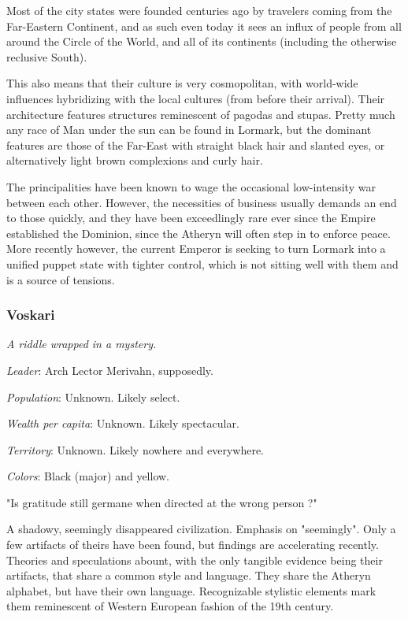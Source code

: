 Most of the city states were founded centuries ago by travelers coming from the Far-Eastern Continent, and as such even today it sees an influx of people from all around the Circle of the World, and all of its continents (including the otherwise reclusive South). 

This also means that their culture is very cosmopolitan, with world-wide influences hybridizing with the local cultures (from before their arrival). Their architecture features structures reminescent of pagodas and stupas. Pretty much any race of Man under the sun can be found in Lormark, but the dominant features are those of the Far-East with straight black hair and slanted eyes, or alternatively light brown complexions and curly hair.

The principalities have been known to wage the occasional low-intensity war between each other. However, the necessities of business usually demands an end to those quickly, and they have been exceedlingly rare ever since the Empire established the Dominion, since the Atheryn will often step in to enforce peace. More recently however, the current Emperor is seeking to turn Lormark into a unified puppet state with tighter control, which is not sitting well with them and is a source of tensions.

	

\subsubsection{Voskari}

\textit{A riddle wrapped in a mystery.}

\textit{Leader}: Arch Lector Merivahn, supposedly.

\textit{Population}: Unknown. Likely select.

\textit{Wealth per capita}: Unknown. Likely spectacular.

\textit{Territory}: Unknown. Likely nowhere and everywhere.
    
\textit{Colors}: Black (major) and yellow.


\begin{rpg-quotebox}
	"Is gratitude still germane when directed at the wrong person ?"
\end{rpg-quotebox}

A shadowy, seemingly disappeared civilization. Emphasis on "seemingly". Only a few artifacts of theirs have been found, but findings are accelerating recently. Theories and speculations abount, with the only tangible evidence being their artifacts, that share a common style and language. They share the Atheryn alphabet, but have their own language. Recognizable stylistic elements mark them reminescent of Western European fashion of the 19th century.

